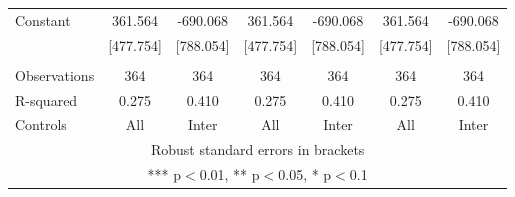 \begin{tabular}{lcccccc}
Constant & 361.564 & -690.068 & 361.564 & -690.068 & 361.564 & -690.068 \\
 & [477.754] & [788.054] & [477.754] & [788.054] & [477.754] & [788.054] \\
 &  &  &  &  &  &  \\
Observations & 364 & 364 & 364 & 364 & 364 & 364 \\
R-squared & 0.275 & 0.410 & 0.275 & 0.410 & 0.275 & 0.410 \\
 Controls & All & Inter & All & Inter & All & Inter \\ \hline
\multicolumn{7}{c}{ Robust standard errors in brackets} \\
\multicolumn{7}{c}{ *** p$<$0.01, ** p$<$0.05, * p$<$0.1} \\
\end{tabular}
